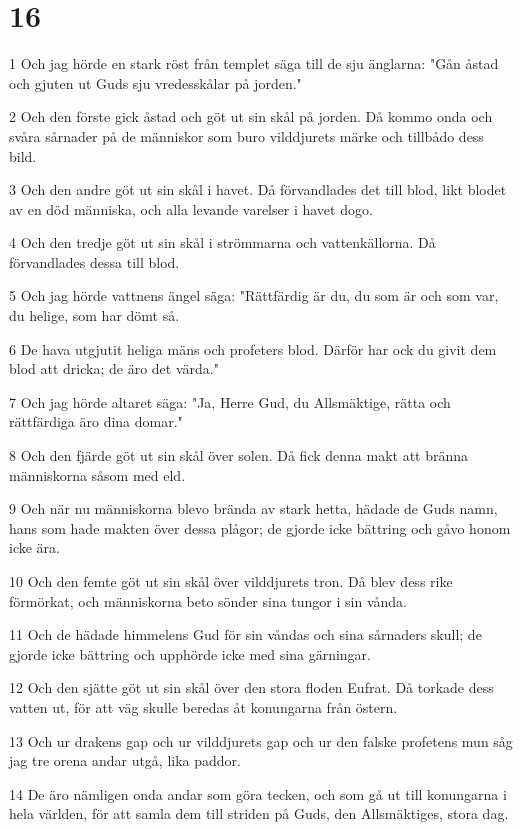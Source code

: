 \chapter{16}

\par 1 Och jag hörde en stark röst från templet säga till de sju änglarna: "Gån åstad och gjuten ut Guds sju vredesskålar på jorden."
\par 2 Och den förste gick åstad och göt ut sin skål på jorden. Då kommo onda och svåra sårnader på de människor som buro vilddjurets märke och tillbådo dess bild.
\par 3 Och den andre göt ut sin skål i havet. Då förvandlades det till blod, likt blodet av en död människa, och alla levande varelser i havet dogo.
\par 4 Och den tredje göt ut sin skål i strömmarna och vattenkällorna. Då förvandlades dessa till blod.
\par 5 Och jag hörde vattnens ängel säga: "Rättfärdig är du, du som är och som var, du helige, som har dömt så.
\par 6 De hava utgjutit heliga mäns och profeters blod. Därför har ock du givit dem blod att dricka; de äro det värda."
\par 7 Och jag hörde altaret säga: "Ja, Herre Gud, du Allsmäktige, rätta och rättfärdiga äro dina domar."
\par 8 Och den fjärde göt ut sin skål över solen. Då fick denna makt att bränna människorna såsom med eld.
\par 9 Och när nu människorna blevo brända av stark hetta, hädade de Guds namn, hans som hade makten över dessa plågor; de gjorde icke bättring och gåvo honom icke ära.
\par 10 Och den femte göt ut sin skål över vilddjurets tron. Då blev dess rike förmörkat, och människorna beto sönder sina tungor i sin vånda.
\par 11 Och de hädade himmelens Gud för sin våndas och sina sårnaders skull; de gjorde icke bättring och upphörde icke med sina gärningar.
\par 12 Och den sjätte göt ut sin skål över den stora floden Eufrat. Då torkade dess vatten ut, för att väg skulle beredas åt konungarna från östern.
\par 13 Och ur drakens gap och ur vilddjurets gap och ur den falske profetens mun såg jag tre orena andar utgå, lika paddor.
\par 14 De äro nämligen onda andar som göra tecken, och som gå ut till konungarna i hela världen, för att samla dem till striden på Guds, den Allsmäktiges, stora dag.
